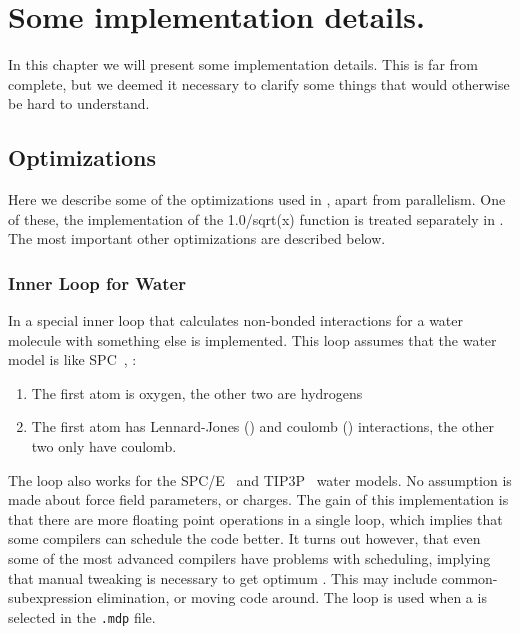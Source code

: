 %
% 
% 
% 
% 
% 
% 
% 
% 
%

\chapter{Some implementation details.}
In this chapter we will present some implementation details. This is
far from complete, but we deemed it necessary to clarify some things
that would otherwise be hard to understand.


\section{Optimizations}
Here we describe some of the optimizations used in {\gromacs}, apart
from parallelism. One of these, the implementation of the 
1.0/sqrt(x) function is treated separately in .
The most important other optimizations are described below.

\subsection{Inner Loop for Water}
In {\gromacs} a special inner loop that calculates non-bonded
interactions for a water molecule with something else is 
implemented. This loop assumes that the water model is like
SPC~\cite{Berendsen81}, {\ie}:
\begin{enumerate}
\item	The first atom is oxygen, the other two are hydrogens
\item	The first atom has Lennard-Jones () and 
	coulomb () interactions, the other
	two only have coulomb.
\end{enumerate}

The loop also works for the SPC/E~\cite{Berendsen87} and 
TIP3P~\cite{Jorgensen83} water models. No assumption is made about
force field parameters, or charges.
The gain of this implementation is that there are more floating point
operations in a single loop, which implies that some compilers
can schedule the code better. It turns out however, that even
some of the most advanced compilers have problems with scheduling, 
implying that manual tweaking is necessary to get optimum 
.
This may include common-subexpression elimination, or moving
code around. 
The loop is used when a  is selected in the 
{\tt .mdp} file.

